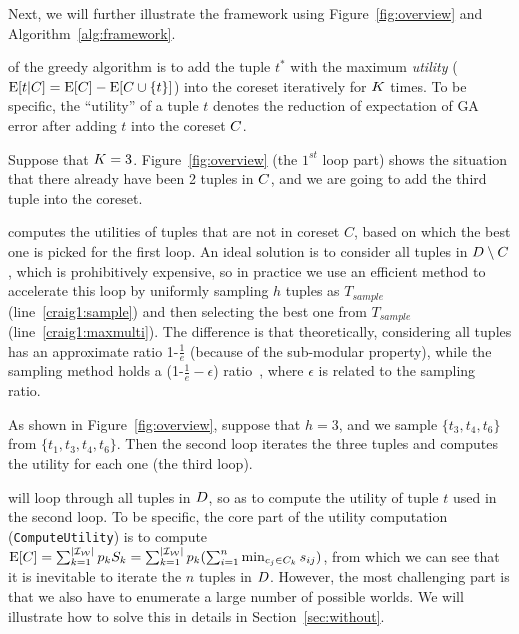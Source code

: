 Next, we will further illustrate the framework using Figure~\ref{fig:overview} and Algorithm~\ref{alg:framework}.





 of  the greedy algorithm is  to add the  tuple $t^*$ with the maximum \textit{utility} (\ie $\mathrm{E}[t|C] = \mathrm{E}[C] - \mathrm{E}[C \cup \{t\}]$) into the coreset iteratively for $K$ times. To be specific, the  ``utility''  of a tuple $t$ denotes the reduction of  expectation of GA error after adding $t$  into the coreset $C$. 

Suppose that $K=3$. Figure~\ref{fig:overview} (the $1^{st}$ loop part) shows the situation that there already have been 2 tuples in $C$, and we are going to add the third tuple into the coreset.


 computes the utilities of  tuples  that are not in coreset $C$, based on which the best one is picked for the first loop. An ideal solution is to consider all tuples in $D \setminus C$, which is prohibitively expensive, so in practice we use an efficient method to accelerate
this loop by uniformly sampling $h$ tuples as $T_{sample}$ (line~\ref{craig1:sample}) and then selecting the best one from $T_{sample}$ (line~\ref{craig1:maxmulti}). The  difference is that theoretically, considering all tuples has an approximate ratio 1-$\frac{1}{e}$ (because of the sub-modular property), while the sampling method holds a (1-$\frac{1}{e}-\epsilon$) ratio~\cite{mirzasoleiman2015lazier}, where $\epsilon$ is related to the sampling ratio.

As shown in Figure~\ref{fig:overview}, suppose that $h=3$, and we sample $\{t_3, t_4, t_6\}$ from $\{t_1, t_3, t_4, t_6\}$. Then the second loop iterates the three tuples and computes the utility for each one (the third loop).


 will loop through all tuples in $D$, so as to compute the utility of tuple $t$ used in the second loop.  To be specific, the core part of the utility computation (\ie \texttt{ComputeUtility}) is to compute $\mathrm{E}[C] = \sum_{k= 1}^{|\mathcal{I_W}|} p_kS_k= \sum_{k= 1}^{|\mathcal{I_W}|} p_k (\sum_{i=1}^n \min_{c_j\in C_k}s_{ij})$, from which we can see that it is inevitable to iterate the $n$ tuples in $D$. However, the most challenging part is that we also have to enumerate a large number of possible worlds. We will illustrate how to solve this in details in Section~\ref{sec:without}.



